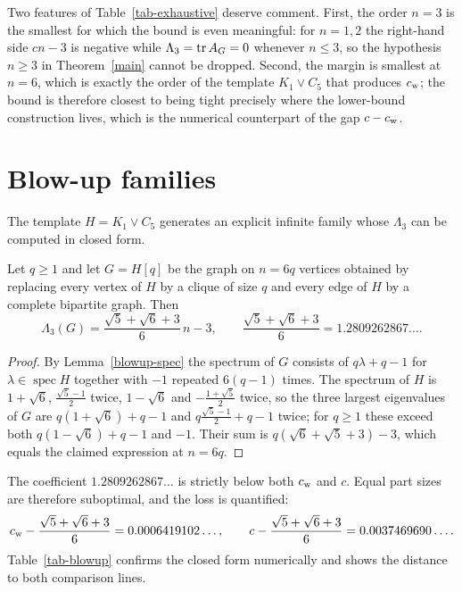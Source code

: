 Two features of Table~\ref{tab-exhaustive} deserve comment. First, the order
$n=3$ is the smallest for which the bound is even meaningful: for $n=1,2$ the
right-hand side $cn-3$ is negative while $\Lambda_3=\operatorname{tr} A_G=0$ whenever
$n\le3$, so the hypothesis $n\ge3$ in Theorem~\ref{main} cannot be dropped.
Second, the margin is smallest at $n=6$, which is exactly the order of the
template $K_1\vee C_5$ that produces $c_{\mathrm{w}}$; the bound is therefore closest
to being tight precisely where the lower-bound construction lives, which is
the numerical counterpart of the gap $c-c_{\mathrm{w}}$.

\section{Blow-up families}\label{sec-blowups}
The template $H=K_1\vee C_5$ generates an explicit infinite family whose
$\Lambda_3$ can be computed in closed form.

\begin{proposition}\label{equal-blowup}
Let $q\ge1$ and let $G=H[q]$ be the graph on $n=6q$ vertices obtained by
replacing every vertex of $H$ by a clique of size $q$ and every edge of $H$ by
a complete bipartite graph. Then
\[
 \Lambda_3(G)=\frac{\sqrt5+\sqrt6+3}{6}\,n-3,
 \qquad
 \frac{\sqrt5+\sqrt6+3}{6}=1.2809262867\ldots .
\]
\end{proposition}
\begin{proof}
By Lemma~\ref{blowup-spec} the spectrum of $G$ consists of $q\lambda+q-1$ for
$\lambda\in\operatorname{spec}H$ together with $-1$ repeated $6(q-1)$ times.
The spectrum of $H$ is
$1+\sqrt6$, $\tfrac{\sqrt5-1}2$ twice, $1-\sqrt6$ and
$-\tfrac{1+\sqrt5}2$ twice, so the three largest eigenvalues of $G$ are
$q(1+\sqrt6)+q-1$ and $q\tfrac{\sqrt5-1}2+q-1$ twice; for $q\ge1$ these
exceed both $q(1-\sqrt6)+q-1$ and $-1$. Their sum is
$q(\sqrt6+\sqrt5+3)-3$, which equals the claimed expression at $n=6q$.
\end{proof}

The coefficient $1.2809262867\ldots$ is strictly below both $c_{\mathrm{w}}$ and $c$.
Equal part sizes are therefore suboptimal, and the loss is quantified:
\[
 c_{\mathrm{w}}-\frac{\sqrt5+\sqrt6+3}{6}=0.0006419102\ldots,
 \qquad
 c-\frac{\sqrt5+\sqrt6+3}{6}=0.0037469690\ldots .
\]
Table~\ref{tab-blowup} confirms the closed form numerically and shows the
distance to both comparison lines.


